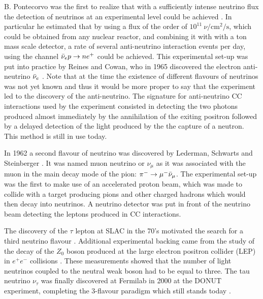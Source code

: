 B. Pontecorvo was the first to realize that with a sufficiently intense neutrino flux the detection of neutrinos at an experimental level could be achieved \cite{Pontecorvo:1946mv}. In particular he estimated that by using a flux of the order of $10^{11} \ \nu/\text{cm}^2/\text{s}$, which could be obtained from any nuclear reactor, and combining it with with a ton mass scale detector, a rate of several anti-neutrino interaction events per day, using the channel $\Bar{\nu}_ep\rightarrow n e^+$ could be achieved. This experimental set-up was put into practice by Reines and Cowan, who in 1965 discovered the electron anti-neutrino $\Bar{\nu}_e$ \cite{Reines:1956rs}. Note that at the time the existence of different flavours of neutrinos was not yet known and thus it would be more proper to say that the experiment led to the discovery of the anti-neutrino.  The signature for anti-neutrino CC interactions used by the experiment consisted in detecting the two photons produced almost immediately by the annihilation of the exiting positron followed by a delayed detection of the light produced by the the capture of a neutron. This method is still in use today.

In 1962 a second flavour of neutrino was discovered by Lederman, Schwarts and Steinberger \cite{Danby:1962nd}. It was named muon neutrino or $\nu_\mu$ as it was associated with the muon in the main decay mode of the pion: $\pi^- \rightarrow \mu^- \Bar{\nu}_\mu$. The experimental set-up was the first to make use of an accelerated proton beam, which was made to collide with a target producing pions and other charged hadrons which would then decay into neutrinos. A neutrino detector was put in front of the neutrino beam detecting the leptons produced in CC interactions.

The discovery of the $\tau$ lepton at SLAC in the 70's motivated the search for a third neutrino flavour \cite{Perl:1975bf}. Additional experimental backing came from the study of the decay of the $Z_0$ boson produced at the large electron positron collider (LEP) in $e^+e^-$ collisions \cite{ALEPH:1989ikb}. These measurements showed that the number of light neutrinos coupled to the neutral weak boson had to be equal to three. The tau neutrino $\nu_\tau$ was finally discovered at Fermilab in 2000 at the DONUT experiment, completing the 3-flavour paradigm which still stands today \cite{DONUT:2000fbd}. 

